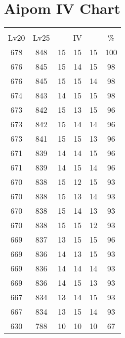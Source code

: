 \documentclass{article}%
\begin{document}
%
\normalsize%
\section{Aipom IV Chart}%
\label{sec:Aipom IV Chart}%
\renewcommand{\arraystretch}{1.5}%
\begin{tabular}{|c|c|c|c|c|c|}%
\hline%
\multicolumn{6}{|c|}{\textcolor{white}{ 
\linebreak{Aipom}
}%
\cellcolor{black}}\\%
\multicolumn{1}{|c}{Lv20}&\multicolumn{1}{c|}{Lv25}&\multicolumn{3}{c|}{IV}&\multicolumn{1}{|c|}{\%}\\%
\hline%
\rowcolor{color100}%
678&848&15&15&15&100\\%
\hline%
\rowcolor{color98}%
676&845&15&14&15&98\\%
\hline%
\rowcolor{color98}%
676&845&15&15&14&98\\%
\hline%
\rowcolor{color98}%
674&843&14&15&15&98\\%
\hline%
\rowcolor{color96}%
673&842&15&13&15&96\\%
\hline%
\rowcolor{color96}%
673&842&15&14&14&96\\%
\hline%
\rowcolor{color96}%
673&841&15&15&13&96\\%
\hline%
\rowcolor{color96}%
671&839&14&14&15&96\\%
\hline%
\rowcolor{color96}%
671&839&14&15&14&96\\%
\hline%
\rowcolor{color93}%
670&838&15&12&15&93\\%
\hline%
\rowcolor{color93}%
670&838&15&13&14&93\\%
\hline%
\rowcolor{color93}%
670&838&15&14&13&93\\%
\hline%
\rowcolor{color93}%
670&838&15&15&12&93\\%
\hline%
\rowcolor{color96}%
669&837&13&15&15&96\\%
\hline%
\rowcolor{color93}%
669&836&14&13&15&93\\%
\hline%
\rowcolor{color93}%
669&836&14&14&14&93\\%
\hline%
\rowcolor{color93}%
669&836&14&15&13&93\\%
\hline%
\rowcolor{color93}%
667&834&13&14&15&93\\%
\hline%
\rowcolor{color93}%
667&834&13&15&14&93\\%
\hline%
\rowcolor{color91}%
630&788&10&10&10&67\\%
\end{tabular}

%
\end{document}
